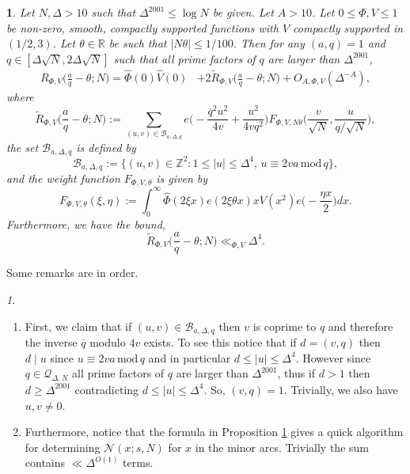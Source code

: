 \documentclass[12pt,reqno]{amsart}
\theoremstyle{plain}
\numberwithin{equation}{section}
\numberwithin{figure}{section}
\theoremstyle{plain}
\newtheorem{prop}{\protect\propositionname}
\theoremstyle{definition}
\theoremstyle{remark}
\newtheorem{rem}[thm]{\protect\remarkname}
\newcommand{\mmod}{\,\mathrm{mod}\,}
\providecommand{\remarkname}{Remark}
\providecommand{\propositionname}{Proposition}
\begin{document}
\begin{prop} \label{prop3}
  Let $N, \Delta > 10$ such that $\Delta^{2001} \leq \log N$ be given.  Let $A>10$.
  Let $0 \leq \Phi, V \leq 1$ be non-zero,
  smooth, compactly supported functions with $V$ compactly supported
 in $(1/2, 3)$. 
  Let $\theta \in \mathbb{R}$ be such that $|N \theta| \leq 1/100$.
   Then for any $(a,q) = 1$ and $q \in [\Delta \sqrt{N}, 2 \Delta \sqrt{N}]$
   such that all prime factors of $q$ are larger than $\Delta^{2001}$,
  \begin{align} \label{eq:form}
  R_{\Phi, V} \Big ( \frac{a}{q} - \theta; N \Big ) 
  = \widehat{\Phi}(0) \widehat{V}(0) & + 2 \widetilde{R}_{\Phi, V} 
  \Big ( \frac{a}{q} - \theta; N \Big ) + O_{A, \Phi, V} (\Delta^{-A}),
  \end{align}
  where
  $$
  \widetilde{R}_{\Phi, V} \Big ( \frac{a}{q} - \theta; N \Big ) 
  := \sum_{(u,v)\in \mathcal{B}_{a, \Delta, q}} 
  e \Big (  - \frac{\overline{q}^2 u^2}{4 v} + \frac{u^2}{4 v q^2} \Big ) 
  F_{\Phi, V, N \theta} 
  \Big ( \frac{v}{\sqrt{N}}, \frac{u}{q / \sqrt{N}} \Big ),
  $$
  the set $\mathcal{B}_{a, \Delta, q}$
  is defined by
  $$
  \mathcal{B}_{a, \Delta, q} :=
  \{(u,v)\in \mathbb{Z}^2: 
  1 \leq |u| \leq \Delta^{4},\,
  u \equiv 2 v a \mmod{q}
  \},
  $$
  and the weight function 
  $F_{\Phi, V, \theta}$ is given by
  $$
  F_{\Phi, V, \theta}(\xi, \eta) 
  := \int_{0}^{\infty} \widehat{\Phi}(2 \xi x) 
  e(2 \xi \theta x) x V(x^2) e \Big ( - \frac{\eta x}{2} \Big ) dx.
  $$
  Furthermore, we have the bound, 
  $$
  \widetilde{R}_{\Phi, V} \Big ( \frac{a}{q} - \theta; N \Big ) \ll_{\Phi, V} \Delta^4. 
  $$
\end{prop}
Some remarks are in order. 
\begin{rem}
  \phantom{a}
  \begin{enumerate}
\item[(a)] First, we claim that if
$(u,v)\in \mathcal{B}_{a, \Delta, q}$
then 
$v$ is coprime to $q$
and therefore the inverse $\overline{q}$ 
modulo $4v$ exists.
To see this notice that
if $d = (v,q)$  
then $d\mid u$ since $u \equiv 2va \mmod q $ and in particular $d \leq |u| \leq \Delta^4$. 
However since $q\in \mathcal{Q}_{\Delta,N}$ all prime 
factors of $q$ are larger than $\Delta^{2001}$, thus 
if $d > 1$ then $d \geq \Delta^{2001}$
contradicting 
$d \leq |u| \leq \Delta^{4}$. 
So, $(v,q)=1$. Trivially, we also have $u,v \neq 0$. 

\item[(b)] Furthermore, notice that the formula 
in Proposition \ref{prop3} 
gives a quick algorithm for determining $\mathcal{N}(x; s, N)$ for $x$ in the minor arcs. Trivially the sum contains $\ll \Delta^{O(1)}$ terms.
  \end{enumerate}
\end{rem}
\end{document}
